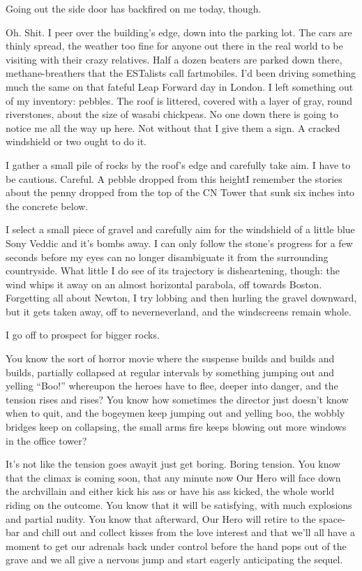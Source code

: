 Going out the side door has backfired on me today, though.

Oh. Shit. I peer over the building’s edge, down into the parking
lot. The cars are thinly spread, the weather too fine for anyone
out there in the real world to be visiting with their crazy
relatives. Half a dozen beaters are parked down there,
methane-breathers that the ESTalists call fartmobiles. I’d been
driving something much the same on that fateful Leap Forward day in
London. I left something out of my inventory: pebbles. The roof is
littered, covered with a layer of gray, round riverstones, about
the size of wasabi chickpeas. No one down there is going to notice
me all the way up here. Not without that I give them a sign. A
cracked windshield or two ought to do it.

I gather a small pile of rocks by the roof’s edge and carefully
take aim. I have to be cautious. Careful. A pebble dropped from
this height{\dash}I remember the stories about the penny dropped from the
top of the CN Tower that sunk six inches into the concrete below.

I select a small piece of gravel and carefully aim for the
windshield of a little blue Sony Veddic and it’s bombs away. I can
only follow the stone’s progress for a few seconds before my eyes
can no longer disambiguate it from the surrounding countryside.
What little I do see of its trajectory is disheartening, though:
the wind whips it away on an almost horizontal parabola, off
towards Boston. Forgetting all about Newton, I try lobbing and then
hurling the gravel downward, but it gets taken away, off to
neverneverland, and the windscreens remain whole.

I go off to prospect for bigger rocks.

You know the sort of horror movie where the suspense builds and
builds and builds, partially collapsed at regular intervals by
something jumping out and yelling “Boo!” whereupon the heroes have
to flee, deeper into danger, and the tension rises and rises? You
know how sometimes the director just doesn’t know when to quit, and
the bogeymen keep jumping out and yelling boo, the wobbly bridges
keep on collapsing, the small arms fire keeps blowing out more
windows in the office tower?

It’s not like the tension goes away{\dash}it just get boring. Boring
tension. You know that the climax is coming soon, that any minute
now Our Hero will face down the archvillain and either kick his ass
or have his ass kicked, the whole world riding on the outcome. You
know that it will be satisfying, with much explosions and partial
nudity. You know that afterward, Our Hero will retire to the
space-bar and chill out and collect kisses from the love interest
and that we’ll all have a moment to get our adrenals back under
control before the hand pops out of the grave and we all give a
nervous jump and start eagerly anticipating the sequel.

